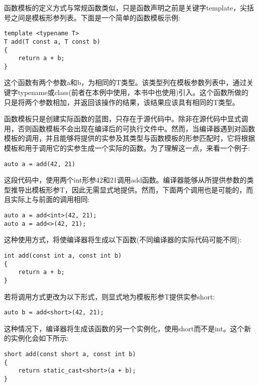 函数模板的定义方式与常规函数类似，只是函数声明之前是关键字template，尖括号之间是模板形参列表。下面是一个简单的函数模板示例:

\begin{lstlisting}[style=styleCXX]
template <typename T>
T add(T const a, T const b)
{
	return a + b;
}
\end{lstlisting}

这个函数有两个参数a和b，为相同的T类型。该类型列在模板参数列表中，通过关键字typename或class(前者在本例中使用，本书中也使用)引入。这个函数所做的只是将两个参数相加，并返回该操作的结果，该结果应该具有相同的T类型。

函数模板只是创建实际函数的蓝图，只存在于源代码中。除非在源代码中显式调用，否则函数模板不会出现在编译后的可执行文件中。然而，当编译器遇到对函数模板的调用，并且能够将提供的实参及其类型与函数模板的形参匹配时，它将根据模板和用于调用它的实参生成一个实际的函数。为了理解这一点，来看一个例子:

\begin{lstlisting}[style=styleCXX]
auto a = add(42, 21)
\end{lstlisting}

这段代码中，使用两个int形参42和21调用add函数。编译器能够从所提供参数的类型推导出模板形参T，因此无需显式地提供。然而，下面两个调用也是可能的，而且实际上与前面的调用相同:

\begin{lstlisting}[style=styleCXX]
auto a = add<int>(42, 21);
auto a = add<>(42, 21);
\end{lstlisting}

这种使用方式，将使编译器将生成以下函数(不同编译器的实际代码可能不同):

\begin{lstlisting}[style=styleCXX]
int add(const int a, const int b)
{
	return a + b;
}
\end{lstlisting}

若将调用方式更改为以下形式，则显式地为模板形参T提供实参short:

\begin{lstlisting}[style=styleCXX]
auto b = add<short>(42, 21);
\end{lstlisting}

这种情况下，编译器将生成该函数的另一个实例化，使用short而不是int。这个新的实例化会如下所示:

\begin{lstlisting}[style=styleCXX]
short add(const short a, const int b)
{
	return static_cast<short>(a + b);
}
\end{lstlisting}

